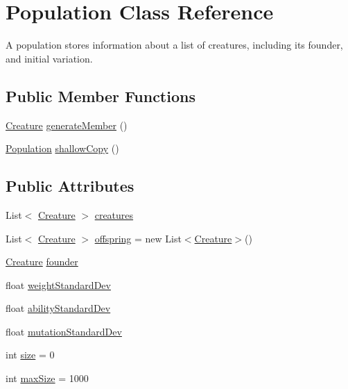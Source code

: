 \hypertarget{class_population}{}\section{Population Class Reference}
\label{class_population}


A population stores information about a list of creatures, including it\textquotesingle{}s founder, and initial variation.  


\subsection*{Public Member Functions}
\begin{DoxyCompactItemize}
\item 
\mbox{\hyperlink{class_creature}{Creature}} \mbox{\hyperlink{class_population_a72997a708270ddf7ae76faff9a97190e}{generate\+Member}} ()
\item 
\mbox{\hyperlink{class_population}{Population}} \mbox{\hyperlink{class_population_a910060609bb65d002204b871df9a6876}{shallow\+Copy}} ()
\end{DoxyCompactItemize}
\subsection*{Public Attributes}
\begin{DoxyCompactItemize}
\item 
List$<$ \mbox{\hyperlink{class_creature}{Creature}} $>$ \mbox{\hyperlink{class_population_a417192b3b7e2f3cd9e9d528752e6c340}{creatures}}
\item 
List$<$ \mbox{\hyperlink{class_creature}{Creature}} $>$ \mbox{\hyperlink{class_population_a69c9eb7cfdb0e5d269ae9ac24290762d}{offspring}} = new List$<$\mbox{\hyperlink{class_creature}{Creature}}$>$()
\item 
\mbox{\hyperlink{class_creature}{Creature}} \mbox{\hyperlink{class_population_ad823b4be605e706379c58ed2880ca7f4}{founder}}
\item 
float \mbox{\hyperlink{class_population_a6b94d7c76b73372f59e95368b301c8f0}{weight\+Standard\+Dev}}
\item 
float \mbox{\hyperlink{class_population_a84fda8156e0f5cf7a90178f879d070b0}{ability\+Standard\+Dev}}
\item 
float \mbox{\hyperlink{class_population_add38fbdaebb253fd3cc2375e36e4d2dc}{mutation\+Standard\+Dev}}
\item 
int \mbox{\hyperlink{class_population_a1df2f4121cc9396d17e0bbc6b8a14b81}{size}} = 0
\item 
int \mbox{\hyperlink{class_population_a8b2bc8fa877db5c7280bbc97b414acf3}{max\+Size}} = 1000
\end{DoxyCompactItemize}


